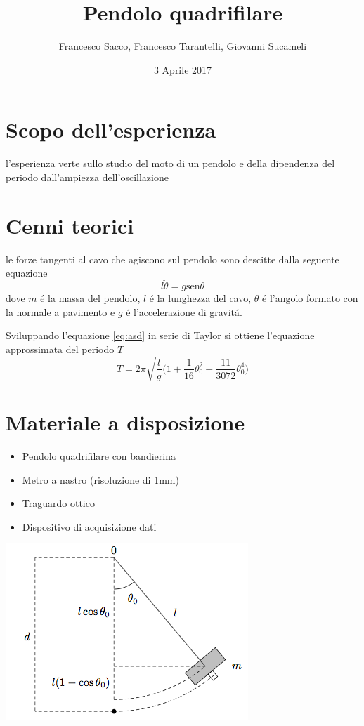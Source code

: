 \documentclass{exam}
\date{3 Aprile 2017}
\title{Pendolo quadrifilare}
\author{Francesco Sacco, Francesco Tarantelli, Giovanni Sucameli}
\begin{document}
	\maketitle
	\section{Scopo dell'esperienza}
		l'esperienza verte sullo studio del moto di un pendolo e della dipendenza del periodo dall'ampiezza dell'oscillazione
	\section{Cenni teorici}
		le forze tangenti al cavo che agiscono sul pendolo sono descitte dalla seguente equazione
		\begin{equation}
			l\ddot{\theta}=g\textrm{sen}\theta \label{eq:asd}
		\end{equation}
		dove $m$ \'e la massa del pendolo, $l$ \'e la lunghezza del cavo, $\theta$ \'e l'angolo formato con la normale a pavimento e $g$ \'e l'accelerazione di gravit\'a.\par
		Sviluppando l'equazione \ref{eq:asd} in serie di Taylor si ottiene l'equazione approssimata del periodo $T$
		\begin{equation}
			T=2\pi\sqrt{\frac{l}{g}}\bigg(1+\frac{1}{16}\theta_{0}^2+\frac{11}{3072}\theta_{0}^4\bigg)
		\end{equation}
	\section{Materiale a disposizione}
		\begin{itemize}
			\item Pendolo quadrifilare con bandierina
			\item Metro a nastro (risoluzione di 1mm)
			\item Traguardo ottico
			\item Dispositivo di acquisizione dati
		\end{itemize}
		\includegraphics{schema_pendolo}
\end{document}

